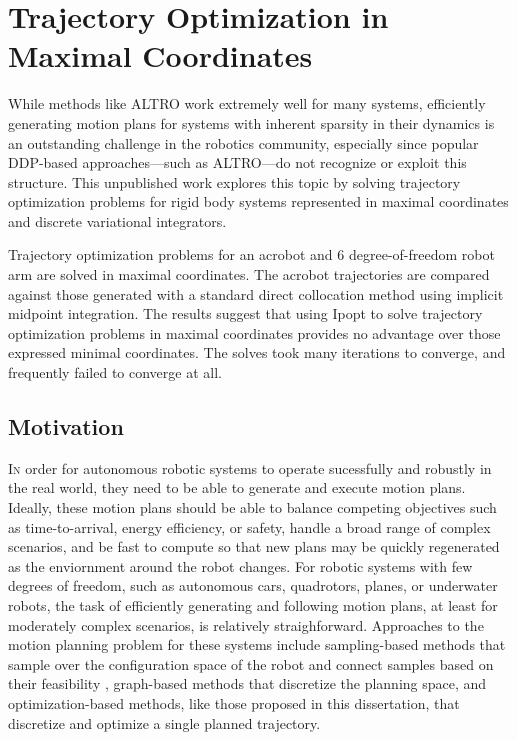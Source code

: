 \documentclass[../root.tex]{subfiles}
\begin{document}
    
\chapter{Trajectory Optimization in Maximal Coordinates}
\label{chap:mctrajop}
While methods like ALTRO work extremely well for many systems,
efficiently generating motion plans for systems with inherent sparsity in their 
dynamics is an outstanding challenge in the robotics community, especially since 
popular DDP-based approaches---such as ALTRO---do not recognize or exploit this structure. 
This unpublished work explores this topic by solving trajectory optimization problems for 
rigid body systems represented in maximal coordinates and discrete variational 
integrators. 

Trajectory optimization problems for an acrobot and 6 degree-of-freedom robot arm 
are solved in maximal coordinates. The acrobot trajectories are compared against 
those generated with a standard direct collocation method using implicit midpoint 
integration. The results suggest that using Ipopt to solve trajectory optimization 
problems in maximal coordinates provides no advantage over those expressed minimal 
coordinates. The solves took many iterations to converge, and frequently failed 
to converge at all. 

\section{Motivation}
\lettrine{I}n order for autonomous robotic systems to operate sucessfully and robustly in the real 
world, they need to be able to generate and execute motion plans. Ideally, these motion 
plans should be able to balance competing objectives such as time-to-arrival, energy 
efficiency, or safety, handle a broad range of complex scenarios, and be fast to compute
so that new plans may be quickly regenerated as the enviornment around the robot changes.
For robotic systems with few degrees of freedom, such as autonomous cars, quadrotors, planes,
or underwater robots, the task of efficiently generating and following motion plans, at least
for moderately complex scenarios, is relatively straighforward. Approaches to the motion 
planning problem for these systems include sampling-based methods that sample over the 
configuration space of the robot and connect samples based on their feasibility 
\cite{lavalle_Planning_2006}, graph-based
methods that discretize the planning space, and optimization-based methods, like those 
proposed in this dissertation,
\cite{howell_ALTRO_2019,jackson_ALTROC_2021,li_Iterative_2004,hargraves_Direct_1987}
that discretize and optimize a single planned trajectory. 
\end{document}
